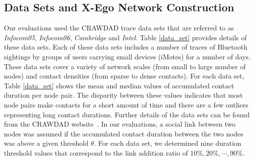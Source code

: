 \subsection{Data Sets and X-Ego Network Construction}\label{data_construction}
   

Our evaluations used the CRAWDAD trace data sets \cite{cambridge-haggle-2009-05-29} that are referred to as {\em Infocom05}, {\em Infocom06},  {\it Cambridge} and {\it Intel}.
Table \ref{data_set} provides details of these data sets. 
Each of these data sets includes a number of traces of Bluetooth sightings by groups of users carrying small devices (iMotes) for a number of days. 
These data sets cover a variety of network scales (from small to large number of nodes) and contact densities (from sparse to dense contacts). 
For each data set, Table \ref{data_set} shows the mean and median values of accumulated contact duration per node pair. 
The disparity between these values indicates that most node pairs make contacts for a short amount of time and there are a few outliers representing long contact durations.
Further details of the data sets can be found from the CRAWDAD website~\cite{crawdad-papers}. 
In our evaluations, a social link between two nodes was assumed if the accumulated contact duration between the two nodes was above a given threshold $\theta$. 
For each data set, we determined nine duration threshold values that correspond to the link addition ratio of $10\%, 20\%, \cdots, 90\%$.  
